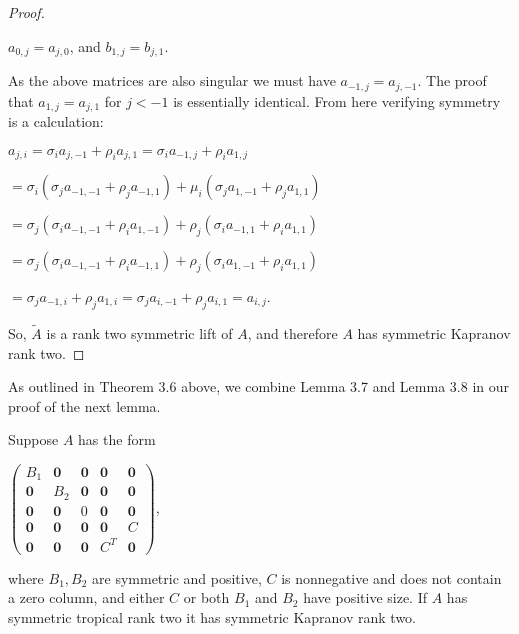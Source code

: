 \documentclass{article}
\begin{document}
\begin{proof}
\begin{center}
    $a_{0,j} = a_{j,0}$, \hspace{.1 in} and \hspace{.1 in} $b_{1,j} = b_{j,1}$.
  \end{center}
  As the above matrices are also singular we must have $a_{-1,j} = a_{j,-1}$. The proof that $a_{1,j} = a_{j,1}$ for $j < -1$ is essentially identical. From here verifying symmetry is a calculation:
  \begin{center}
    
    $a_{j,i} = \sigma_{i} a_{j,-1} + \rho_{i} a_{j,1} = \sigma_{i} a_{-1,j} + \rho_{i} a_{1,j}$
    
    $= \sigma_{i} (\sigma_{j} a_{-1,-1} + \rho_{j} a_{-1,1}) + \mu_{i} (\sigma_{j} a_{1,-1} + \rho_{j} a_{1,1})$
    
    $= \sigma_{j} (\sigma_{i} a_{-1,-1} + \rho_{i} a_{1,-1}) + \rho_{j} (\sigma_{i} a_{-1,1} + \rho_{i} a_{1,1})$
    
    $= \sigma_{j} (\sigma_{i} a_{-1,-1} + \rho_{i} a_{-1,1}) + \rho_{j} (\sigma_{i} a_{1,-1} + \rho_{i} a_{1,1})$
    
    $= \sigma_{j} a_{-1,i} + \rho_{j} a_{1,i} = \sigma_{j} a_{i,-1} + \rho_{j} a_{i,1} = a_{i,j}$.
  \end{center}
  
  So, $\tilde{A}$ is a rank two symmetric lift of $A$, and therefore $A$ has symmetric Kapranov rank two.
\end{proof}

As outlined in Theorem 3.6 above, we combine Lemma 3.7 and Lemma 3.8 in our proof of the next lemma.

\begin{lem}
  Suppose $A$ has the form  
  \begin{center}
    $\left(\begin{array}{ccccc} B_{1} & \textbf{0} & \textbf{0} & \textbf{0} & \textbf{0} \\ \textbf{0} & B_{2} & \textbf{0} & \textbf{0} & \textbf{0} \\ \textbf{0} & \textbf{0} & 0 & \textbf{0} & \textbf{0} \\ \textbf{0} & \textbf{0} & \textbf{0} & \textbf{0} & C \\ \textbf{0} & \textbf{0} & \textbf{0} & C^{T} & \textbf{0} \end{array}\right)$,
  \end{center}
  where $B_{1}, B_{2}$ are symmetric and positive, $C$ is nonnegative and does not contain a zero column, and either $C$ or both $B_{1}$ and $B_{2}$ have positive size. If $A$ has symmetric tropical rank two it has symmetric Kapranov rank two.
\end{lem}
\end{document}
